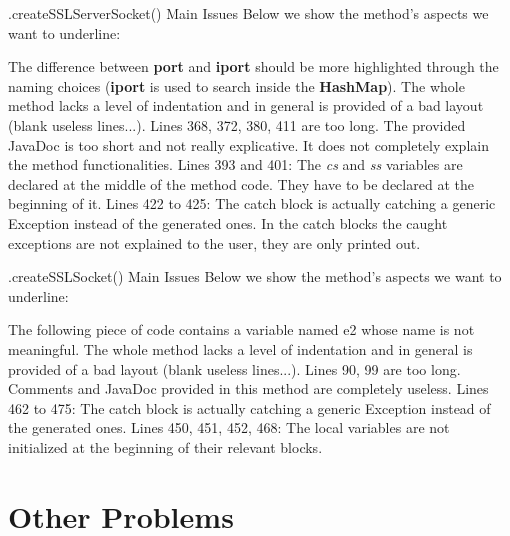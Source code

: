 \documentclass{../common/latex_classes/pdf_presentation}
\begin{document}
	\begin{frame}{.createSSLServerSocket() Main Issues}
		Below we show the method's aspects we want to underline:
		\begin{itemize}
			 The difference between \textbf{port} and \textbf{iport} should be more highlighted through the naming choices (\textbf{iport} is used to search inside the \textbf{HashMap}).%
			 The whole method 	lacks a level of indentation and in general is provided of a bad layout (blank useless lines...).
			 Lines 368, 372, 380, 411 are too long.
			 The provided JavaDoc is too short and not really explicative. It does not completely explain the method functionalities.
			 Lines 393 and 401: The \textit{cs} and \textit{ss} variables are declared at the middle of the method code. They have to be declared at the beginning of it.
			 Lines 422 to 425: The catch block is actually catching a generic Exception instead of the generated ones.
			 In the catch blocks the caught exceptions are not explained to the user, they are only printed out.
		\end{itemize}
	\end{frame}
	
	\begin{frame}{.createSSLSocket() Main Issues}
		Below we show the method's aspects we want to underline:
		\begin{itemize}
			 The following piece of code contains a variable named e2 whose name is not meaningful.%
			 The whole method 	lacks a level of indentation and in general is provided of a bad layout (blank useless lines...).
			 Lines 90, 99 are too long.
			Comments and JavaDoc provided in this method are completely useless.
			 Lines 462 to 475: The catch block is actually catching a generic Exception instead of the generated ones.
			 Lines 450, 451, 452, 468: The local variables are not initialized at the beginning of their relevant blocks.
		\end{itemize}
	\end{frame}
	
	\section{Other Problems}
	
\end{document}
